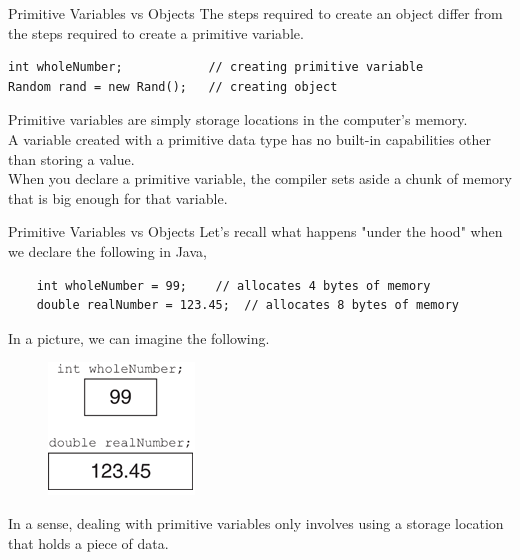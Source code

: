\documentclass[11pt]{beamer}
\begin{document}
\begin{frame}[fragile]{Primitive Variables vs Objects}
    The steps required to create an object differ from the steps required to create a primitive variable.
    \begin{lstlisting}
int wholeNumber;            // creating primitive variable
Random rand = new Rand();   // creating object
    \end{lstlisting}
    Primitive variables are simply storage locations in the computer’s memory. \\
    \vspace{1em}
    A variable created with a primitive data type has no built-in capabilities other than storing a value. \\
    \vspace{1em}
    When you declare a primitive variable, the compiler sets aside a chunk of memory that is big enough for that variable.
\end{frame}

\begin{frame}[fragile]{Primitive Variables vs Objects}
    Let's recall what happens "under the hood" when we declare the following in Java,
    \begin{lstlisting}
    int wholeNumber = 99;    // allocates 4 bytes of memory
    double realNumber = 123.45;  // allocates 8 bytes of memory
    \end{lstlisting}
    In a picture, we can imagine the following.
    \noindent 
    \begin{figure}[H]
    \centering
    \includegraphics[scale=0.6]{Images/chapter06_NumberInBox.png}
    \end{figure}
    In a sense, dealing with primitive variables only  involves using a storage location that holds a piece of data.
\end{frame}
\end{document}
